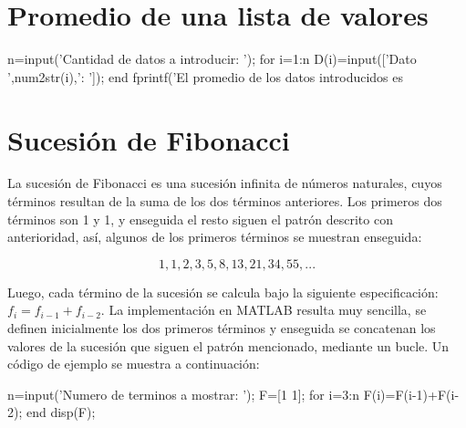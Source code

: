 \section{Promedio de una lista de valores}


\sol

\begin{matlab}
n=input('Cantidad de datos a introducir: ');
for i=1:n
    D(i)=input(['Dato ',num2str(i),': ']);
end
fprintf('El promedio de los datos introducidos es %
\end{matlab}


\section{Sucesión de Fibonacci}


\sol

La sucesión de Fibonacci es una sucesión infinita de números naturales, cuyos términos resultan de la 
suma de los dos términos anteriores. Los primeros dos términos son 1 y 1, y enseguida el resto siguen 
el patrón descrito con anterioridad, así, algunos de los primeros términos se muestran enseguida:

$$ 1,1,2,3,5,8,13,21,34,55,... $$

Luego, cada término de la sucesión se calcula bajo la siguiente especificación: $f_i=f_{i-1}+f_{i-2}$. 
La implementación en MATLAB resulta muy sencilla, se definen inicialmente los dos primeros términos y 
enseguida se concatenan los valores de la sucesión que siguen el patrón mencionado, mediante un bucle. 
Un código de ejemplo se muestra a continuación:

\begin{matlab}
n=input('Numero de terminos a mostrar: ');
F=[1 1];
for i=3:n
    F(i)=F(i-1)+F(i-2);
end
disp(F);
\end{matlab}


